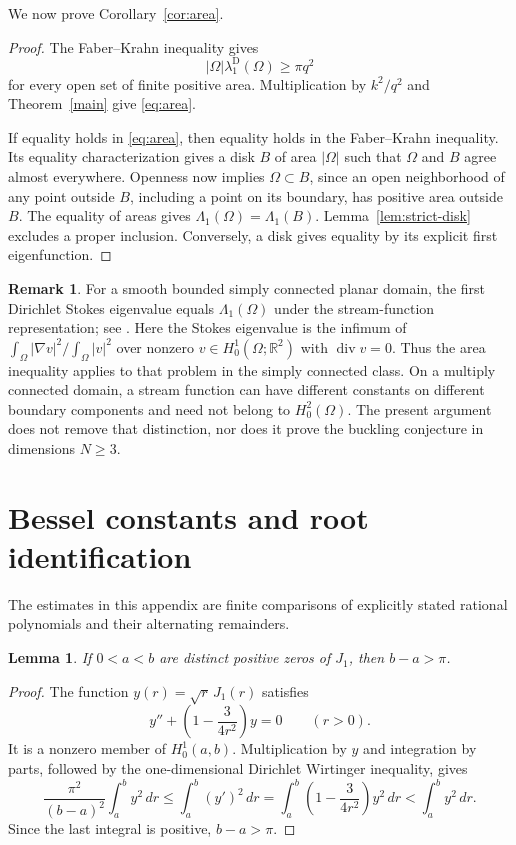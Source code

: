 \documentclass[11pt,letterpaper,reqno]{amsart}
\newtheorem{lemma}[theorem]{Lemma}
\theoremstyle{definition}
\newtheorem{remark}[theorem]{Remark}
\begin{document}
We now prove Corollary~\ref{cor:area}.
\begin{proof}
The Faber--Krahn inequality \cite{Faber,Krahn} gives
\[
 |\Omega|\lambda_1^{\mathrm D}(\Omega)\ge\pi q^2
\]
for every open set of finite positive area. Multiplication by $k^2/q^2$
and Theorem~\ref{main} give \eqref{eq:area}.

If equality holds in \eqref{eq:area}, then equality holds in the
Faber--Krahn inequality. Its equality characterization gives a disk $B$
of area $|\Omega|$ such that $\Omega$ and $B$ agree almost everywhere.
Openness now implies $\Omega\subset B$, since an open
neighborhood of any point outside $B$, including a point on its
boundary, has positive area outside $B$.
The equality of areas gives $\Lambda_1(\Omega)=\Lambda_1(B)$.
Lemma~\ref{lem:strict-disk} excludes a proper inclusion. Conversely,
a disk gives equality by its explicit first eigenfunction.
\end{proof}

\begin{remark}
For a smooth bounded simply connected planar domain, the first
Dirichlet Stokes eigenvalue equals $\Lambda_1(\Omega)$ under the
stream-function representation; see \cite[Remark~1]{HMP}.
Here the Stokes eigenvalue is the infimum of
$\int_\Omega|\nabla v|^2/\int_\Omega|v|^2$ over nonzero
$v\in H_0^1(\Omega;\mathbb R^2)$ with $\operatorname{div}v=0$.
Thus the area inequality applies to that
problem in the simply connected class. On a multiply connected
domain, a stream function can have different constants on different
boundary components and need not belong to $H_0^2(\Omega)$.
The present argument does not remove that distinction, nor does it
prove the buckling conjecture in dimensions $N\ge3$.
\end{remark}
\appendix
\section{Bessel constants and root identification}\label{app:constants}
The estimates in this appendix are finite comparisons of explicitly
stated rational polynomials and their alternating remainders.

\begin{lemma}
\label{subm:J1-separation}
If $0<a<b$ are distinct positive zeros of $J_1$, then $b-a>\pi$.
\end{lemma}
\begin{proof}
The function $y(r)=\sqrt r\,J_1(r)$ satisfies
\[
 y''+\left(1-\frac{3}{4r^2}\right)y=0\qquad(r>0).
\]
It is a nonzero member of $H_0^1(a,b)$.  Multiplication by $y$ and
integration by parts, followed by the one-dimensional Dirichlet
Wirtinger inequality, gives
\[
 \frac{\pi^2}{(b-a)^2}\int_a^b y^2\,dr
 \le\int_a^b(y')^2\,dr
 =\int_a^b\left(1-\frac{3}{4r^2}\right)y^2\,dr
 <\int_a^b y^2\,dr.
\]
Since the last integral is positive, $b-a>\pi$.
\end{proof}
\end{document}
